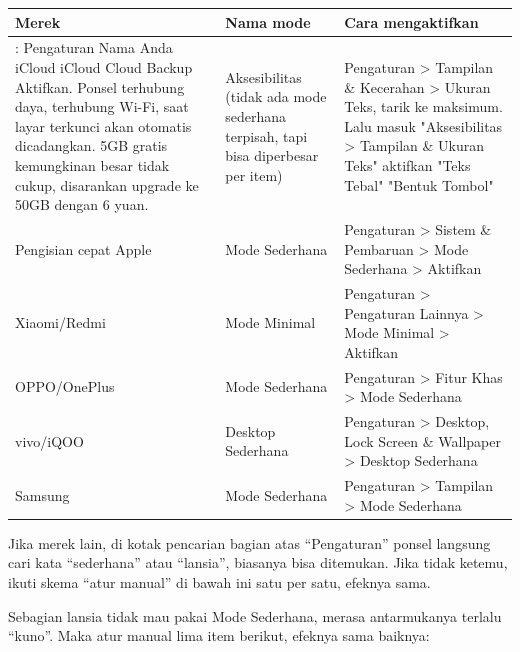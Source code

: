 
\begin{center}
\begin{tabularx}{\linewidth}{|X|X|X|}
\hline
\textbf{Merek} & \textbf{Nama mode} & \textbf{Cara mengaktifkan} \tabularnewline
\hline
: Pengaturan Nama Anda iCloud iCloud Cloud Backup Aktifkan. Ponsel terhubung daya, terhubung Wi-Fi, saat layar terkunci akan otomatis dicadangkan. 5GB gratis kemungkinan besar tidak cukup, disarankan upgrade ke 50GB dengan 6 yuan. & Aksesibilitas (tidak ada mode sederhana terpisah, tapi bisa diperbesar per item) & Pengaturan > Tampilan \& Kecerahan > Ukuran Teks, tarik ke maksimum. Lalu masuk "Aksesibilitas > Tampilan \& Ukuran Teks" aktifkan "Teks Tebal" "Bentuk Tombol" \tabularnewline
Pengisian cepat Apple & Mode Sederhana & Pengaturan > Sistem \& Pembaruan > Mode Sederhana > Aktifkan \tabularnewline
Xiaomi/Redmi & Mode Minimal & Pengaturan > Pengaturan Lainnya > Mode Minimal > Aktifkan \tabularnewline
OPPO/OnePlus & Mode Sederhana & Pengaturan > Fitur Khas > Mode Sederhana \tabularnewline
vivo/iQOO & Desktop Sederhana & Pengaturan > Desktop, Lock Screen \& Wallpaper > Desktop Sederhana \tabularnewline
Samsung & Mode Sederhana & Pengaturan > Tampilan > Mode Sederhana \tabularnewline
\hline
\end{tabularx}
\end{center}

Jika merek lain, di kotak pencarian bagian atas “Pengaturan” ponsel langsung cari kata “sederhana” atau “lansia”, biasanya bisa ditemukan. Jika tidak ketemu, ikuti skema “atur manual” di bawah ini satu per satu, efeknya sama.


Sebagian lansia tidak mau pakai Mode Sederhana, merasa antarmukanya terlalu “kuno”. Maka atur manual lima item berikut, efeknya sama baiknya:

